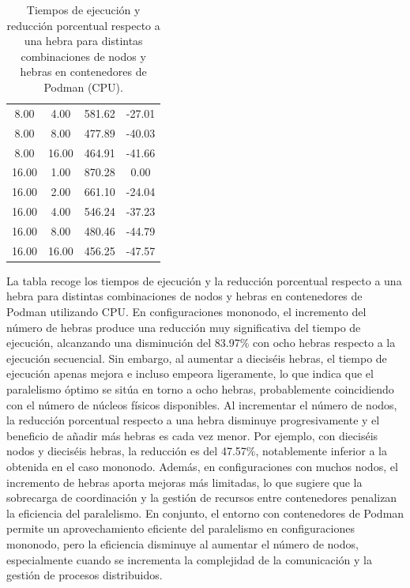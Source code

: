 \begin{table}[ht]
\begin{tabular}{|c|c|c|c|}
        8.00           & 4.00            & 581.62              & -27.01                         \\
        8.00           & 8.00            & 477.89              & -40.03                         \\
        8.00           & 16.00           & 464.91              & -41.66                         \\
        16.00          & 1.00            & 870.28              & 0.00                           \\
        16.00          & 2.00            & 661.10              & -24.04                         \\
        16.00          & 4.00            & 546.24              & -37.23                         \\
        16.00          & 8.00            & 480.46              & -44.79                         \\
        16.00          & 16.00           & 456.25              & -47.57                         \\
        \hline
    \end{tabular}
    \caption{Tiempos de ejecución y reducción porcentual respecto a una hebra para distintas combinaciones de nodos y hebras en contenedores de Podman (CPU).}
    \label{tab:thread_sweep_ubuntu_podman_time}
\end{table}

La tabla recoge los tiempos de ejecución y la reducción porcentual respecto a una hebra para distintas combinaciones de nodos y hebras en contenedores de Podman utilizando CPU. En configuraciones mononodo, el incremento del número de hebras produce una reducción muy significativa del tiempo de ejecución, alcanzando una disminución del 83.97\% con ocho hebras respecto a la ejecución secuencial. Sin embargo, al aumentar a dieciséis hebras, el tiempo de ejecución apenas mejora e incluso empeora ligeramente, lo que indica que el paralelismo óptimo se sitúa en torno a ocho hebras, probablemente coincidiendo con el número de núcleos físicos disponibles. Al incrementar el número de nodos, la reducción porcentual respecto a una hebra disminuye progresivamente y el beneficio de añadir más hebras es cada vez menor. Por ejemplo, con dieciséis nodos y dieciséis hebras, la reducción es del 47.57\%, notablemente inferior a la obtenida en el caso mononodo. Además, en configuraciones con muchos nodos, el incremento de hebras aporta mejoras más limitadas, lo que sugiere que la sobrecarga de coordinación y la gestión de recursos entre contenedores penalizan la eficiencia del paralelismo. En conjunto, el entorno con contenedores de Podman permite un aprovechamiento eficiente del paralelismo en configuraciones mononodo, pero la eficiencia disminuye al aumentar el número de nodos, especialmente cuando se incrementa la complejidad de la comunicación y la gestión de procesos distribuidos.


